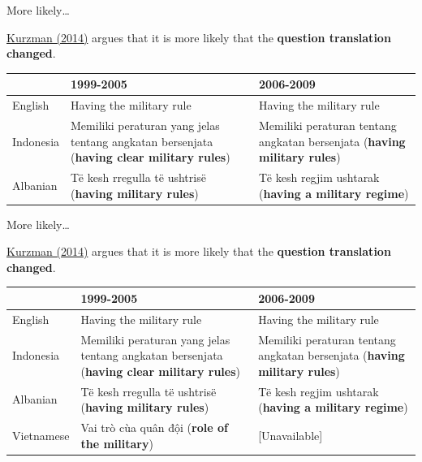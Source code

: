 \documentclass[10pt]{beamer}
\begin{document}
\begin{frame}{More likely\ldots}

    \href{https://www.washingtonpost.com/news/monkey-cage/wp/2014/09/02/world-values-lost-in-translation/}{Kurzman (2014)} argues that it is more likely that the \textbf{question translation changed}.
{\small{
    \begin{table}
        \begin{tabular}{l p{3.5cm} p{3.5cm}}
        \hline
        & 1999-2005 & 2006-2009\\
        \hline\hline
        English & Having the military rule & Having the military rule \\

        Indonesia & Memiliki peraturan yang jelas tentang angkatan bersenjata (\textbf{having clear military rules}) & Memiliki peraturan tentang angkatan bersenjata (\textbf{having military rules})\\

        Albanian & T\"{e} kesh rregulla t\"{e} ushtris\"{e} (\textbf{having military rules}) & T\"{e} kesh regjim ushtarak (\textbf{having a military regime}) \\

        \hline
        \end{tabular}
    \end{table}

}}

\end{frame}

\begin{frame}{More likely\ldots}

    \href{https://www.washingtonpost.com/news/monkey-cage/wp/2014/09/02/world-values-lost-in-translation/}{Kurzman (2014)} argues that it is more likely that the \textbf{question translation changed}.
{\small{
    \begin{table}
        \begin{tabular}{l p{3.5cm} p{3.5cm}}
        \hline
        & 1999-2005 & 2006-2009\\
        \hline\hline
        English & Having the military rule & Having the military rule \\

        Indonesia & Memiliki peraturan yang jelas tentang angkatan bersenjata (\textbf{having clear military rules}) & Memiliki peraturan tentang angkatan bersenjata (\textbf{having military rules})\\

        Albanian & T\"{e} kesh rregulla t\"{e} ushtris\"{e} (\textbf{having military rules}) & T\"{e} kesh regjim ushtarak (\textbf{having a military regime}) \\

        Vietnamese & Vai tr\`{o} c\`{u}a qu\^{a}n đội (\textbf{role of the military}) & [Unavailable] \\

        \hline
        \end{tabular}
    \end{table}

}}

\end{frame}
\end{document}
